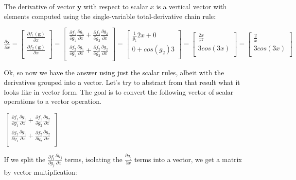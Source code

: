 \documentclass[11pt]{article}
\begin{document}
The derivative of vector $\mathbf{y}$ with respect to scalar $x$ is a vertical vector with elements computed using the single-variable total-derivative chain rule:

$\frac{\partial \mathbf{y}}{\partial x}  =
\begin{bmatrix}
	\frac{\partial f_1(\mathbf{g})}{\partial x}\\
	\frac{\partial f_2(\mathbf{g})}{\partial x}\\
\end{bmatrix} = \begin{bmatrix}
	\frac{\partial f_1}{\partial g_1}\frac{\partial g_1}{\partial x} + \frac{\partial f_1}{\partial g_2}\frac{\partial g_2}{\partial x}\\
	\frac{\partial f_2}{\partial g_1}\frac{\partial g_1}{\partial x} + \frac{\partial f_2}{\partial g_2}\frac{\partial g_2}{\partial x}\\
\end{bmatrix} = \begin{bmatrix}
	\frac{1}{g_1}2x + 0\\
	0 + cos(g_2)3\\
\end{bmatrix} = \begin{bmatrix}
	\frac{2x}{x^2}\\
	3cos(3x)\\
\end{bmatrix} = \begin{bmatrix}
	\frac{2}{x}\\
	3cos(3x)\\
\end{bmatrix}
$

Ok, so now we have the answer using just the scalar rules, albeit with the derivatives grouped into a vector. Let's try to abstract from that result what it looks like in vector form.  The goal is to convert the following vector of scalar operations to a vector operation. 

$
\begin{bmatrix}
	\frac{\partial f_1}{\partial g_1}\frac{\partial g_1}{\partial x} + \frac{\partial f_1}{\partial g_2}\frac{\partial g_2}{\partial x}\\
	\frac{\partial f_2}{\partial g_1}\frac{\partial g_1}{\partial x} + \frac{\partial f_2}{\partial g_2}\frac{\partial g_2}{\partial x}\\
\end{bmatrix}
$

If we split the $\frac{\partial f_i}{\partial g_j}\frac{\partial g_j}{\partial x}$ terms, isolating the $\frac{\partial g_j}{\partial x}$ terms into a vector, we get a matrix by vector multiplication:
\end{document}
